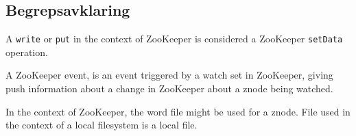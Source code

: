 \subsection{Begrepsavklaring}
A \texttt{write} or \texttt{put} in the context of ZooKeeper is considered a ZooKeeper \texttt{setData} operation.

A ZooKeeper event, is an event triggered by a watch set in ZooKeeper, giving push information about a change in ZooKeeper about a znode being watched.

In the context of ZooKeeper, the word file might be used for a znode. File used in the context of a local filesystem is a local file.


